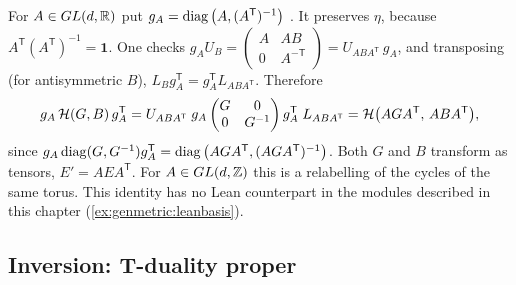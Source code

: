 For $A\in GL(d,\mathbb{R})$ put $g_A=\operatorname{diag}\big(A,(A^{\mathsf T})^{-1}\big)$
. It preserves $\eta$, because
$A^{\mathsf T}(A^{\mathsf T})^{-1}=\mathbf 1$. One checks
$g_AU_B=\left(\begin{smallmatrix}A&AB\\0&A^{-\mathsf T}\end{smallmatrix}\right)
=U_{ABA^{\mathsf T}}\,g_A$, and transposing (for antisymmetric $B$),
$L_Bg_A^{\mathsf T}=g_A^{\mathsf T}L_{ABA^{\mathsf T}}$. Therefore
\begin{equation}\label{eq:genmetric:basis}
 g_A\,\mathcal{H}(G,B)\,g_A^{\mathsf T}
 =U_{ABA^{\mathsf T}}\;g_A\begin{pmatrix}G&0\\0&G^{-1}\end{pmatrix}g_A^{\mathsf T}\;
 L_{ABA^{\mathsf T}}
 =\mathcal{H}\big(AGA^{\mathsf T},\,ABA^{\mathsf T}\big),
\end{equation}
since $g_A\operatorname{diag}(G,G^{-1})g_A^{\mathsf T}=\operatorname{diag}\big(AGA^{\mathsf T},(AGA^{\mathsf T})^{-1}\big)$.
Both $G$ and $B$ transform as tensors, $E'=AEA^{\mathsf T}$. For $A\in GL(d,\mathbb{Z})$ this is a
relabelling of the cycles of the same torus. This identity has no Lean counterpart in the
modules described in this chapter (\cref{ex:genmetric:leanbasis}).

\subsection{Inversion: T-duality proper}

